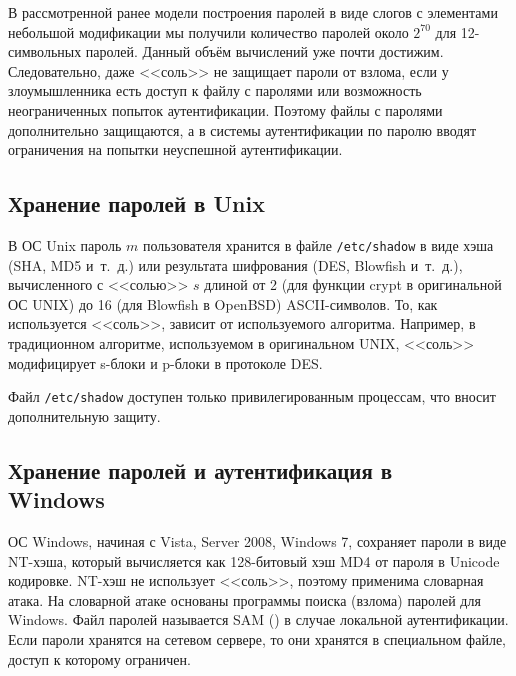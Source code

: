В рассмотренной ранее модели построения паролей в виде слогов с элементами небольшой модификации мы получили количество паролей около $2^{70}$ для 12-символьных паролей. Данный объём вычислений уже почти достижим. Следовательно, даже <<соль>> не защищает пароли от взлома, если у злоумышленника есть доступ к файлу с паролями или возможность неограниченных попыток аутентификации. Поэтому файлы с паролями дополнительно защищаются, а в системы аутентификации по паролю вводят ограничения на попытки неуспешной аутентификации.

\subsection[Unix]{Хранение паролей в Unix}

В ОС Unix пароль $m$ пользователя хранится в файле \texttt{/etc/shadow} в виде хэша (SHA, MD5 и~т.~д.) или результата шифрования (DES, Blowfish и~т.~д.), вычисленного с <<солью>> $s$ длиной от 2 (для функции crypt в оригинальной ОС UNIX) до 16 (для Blowfish в OpenBSD) ASCII-символов. То, как используется <<соль>>, зависит от используемого алгоритма. Например, в традиционном алгоритме, используемом в оригинальном UNIX, <<соль>> модифицирует s-блоки и p-блоки в протоколе DES.

Файл \texttt{/etc/shadow} доступен только привилегированным процессам, что вносит дополнительную защиту.


\subsection[Windows]{Хранение паролей и аутентификация в \protect\\ Windows}


ОС Windows, начиная с Vista, Server 2008, Windows 7, сохраняет пароли в виде NT-хэша, который вычисляется как 128-битовый хэш MD4 от пароля в Unicode кодировке. NT-хэш не использует <<соль>>, поэтому применима словарная атака. На словарной атаке основаны программы поиска (взлома) паролей для Windows. Файл паролей называется SAM () в случае локальной аутентификации. Если пароли хранятся на сетевом сервере, то они хранятся в специальном файле, доступ к которому ограничен.

